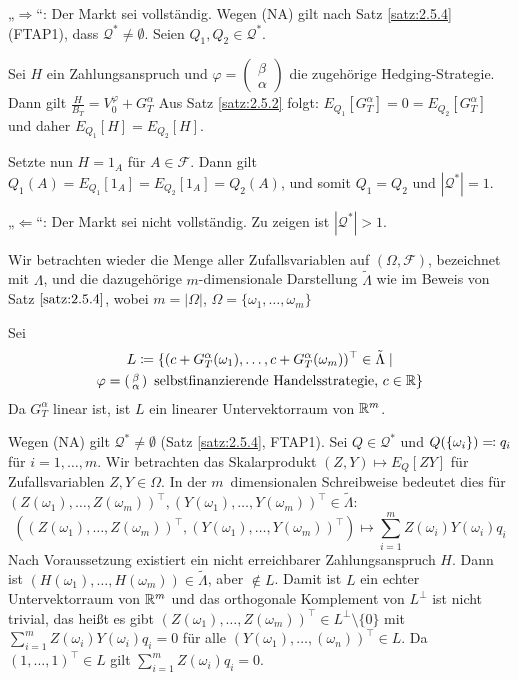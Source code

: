 \documentclass[a4paper,twoside,DIV15,BCOR12mm]{scrbook}
\newcommand{\cF}{\mathcal F}
\newcommand{\cQ}{\mathcal Q}
\begin{document}
\begin{beweis}
„$\Longrightarrow$“: Der Markt sei vollständig. Wegen (NA) gilt nach Satz \ref{satz:2.5.4} (FTAP1), dass $\cQ^* \ne \emptyset$. Seien $Q_1,Q_2\in \cQ^*$.


Sei $H$ ein Zahlungsanspruch und
$\varphi=\left(\begin{smallmatrix} \beta \\ \alpha \end{smallmatrix}\right)$
die zugehörige Hedging-Strategie. Dann gilt
$ \frac{H}{B_T} = V_0^\varphi + G_T^\alpha $
Aus Satz \ref{satz:2.5.2} folgt: $E_{Q_1}[G_T^\alpha] = 0 = E_{Q_2}[G_T^\alpha]$ und daher $E_{Q_1}[H] = E_{Q_2}[H]$.

Setzte nun $H=1_A$ für $A\in \cF$. Dann gilt $Q_1(A) = E_{Q_1}[1_A] = E_{Q_2}[1_A] = Q_2(A)$, und somit $Q_1 = Q_2$ und $|\cQ^*|=1$.

„$\Longleftarrow$“: Der Markt sei nicht vollständig. Zu zeigen ist $|\cQ^*|>1$.

Wir betrachten wieder die Menge aller Zufallsvariablen auf $(\Omega,\cF)$, bezeichnet mit $\Lambda$, und die dazugehörige $m$-dimensionale Darstellung $\tilde\Lambda$ wie im Beweis von Satz $\ref{satz:2.5.4}$, wobei $m=|\Omega|$, $\Omega = \{\omega_1,\ldots,\omega_m\}$

Sei
\begin{multline*}
L \da \{ (c + G_T^\alpha(\omega_1), \ldots, c+ G_T^\alpha(\omega_m))^\top \in \tilde\Lambda \mid \\
\varphi=\left(\begin{smallmatrix} \beta \\ \alpha \end{smallmatrix}\right)
\text{ selbstfinanzierende Handelsstrategie, } c\in \MdR\}
\end{multline*}
Da $G_T^\alpha$ linear ist, ist $L$ ein linearer Untervektorraum von $\mathbb{R}^m$.

Wegen (NA) gilt $\cQ^*\ne \emptyset$ (Satz \ref{satz:2.5.4}, FTAP1). Sei $Q\in\cQ^*$ und $Q(\{\omega_i\})\ad q_i$ für $i=1,\ldots,m$. Wir betrachten das Skalarprodukt $(Z,Y)\mapsto E_Q[ZY]$ für Zufallsvariablen $Z,Y\in\Omega$. In der $m$~dimensionalen Schreibweise bedeutet dies für $(Z(\omega_1),\ldots,Z(\omega_m))^\top, (Y(\omega_1),\ldots,Y(\omega_m))^\top\in \tilde\Lambda$:
\[
((Z(\omega_1),\ldots,Z(\omega_m))^\top, (Y(\omega_1),\ldots,Y(\omega_m))^\top) \mapsto \sum_{i=1}^m Z(\omega_i)Y(\omega_i)q_i
\]
Nach Voraussetzung existiert ein nicht erreichbarer Zahlungsanspruch $H$. Dann ist $(H(\omega_1),\ldots,H(\omega_m)) \in \tilde\Lambda$, aber $\notin L$. Damit ist $L$ ein echter Untervektorraum von $\mathbb{R}^m$ und das orthogonale Komplement von $L^\bot$ ist nicht trivial, das heißt  es gibt $(Z(\omega_1),\ldots,Z(\omega_m))^\top\in L^\bot\setminus\{0\}$ mit $\sum_{i=1}^m Z(\omega_i)Y(\omega_i)q_i= 0$ für alle $(Y(\omega_1),\ldots,(\omega_n))^\top\in L$. Da $(1,\ldots,1)^\top\in L$ gilt $\sum_{i=1}^mZ(\omega_i)q_i = 0$.


\end{beweis}
\end{document}
